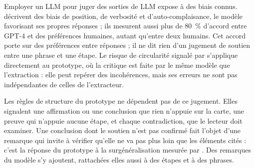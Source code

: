 Employer un LLM pour juger des sorties de LLM expose à des biais connus. \textcite[1]{ref29} décrivent des biais de position, de verbosité et d’auto-complaisance, le modèle favorisant ses propres réponses ; ils mesurent aussi plus de 80~\% d’accord entre GPT-4 et des préférences humaines, autant qu’entre deux humains. Cet accord porte sur des préférences entre réponses ; il ne dit rien d’un jugement de soutien entre une phrase et une étape. Le risque de circularité signalé par \textcite[7]{ref06} s’applique directement au prototype, où la critique est faite par le même modèle que l’extraction : elle peut repérer des incohérences, mais ses erreurs ne sont pas indépendantes de celles de l’extracteur.

Les règles de structure du prototype ne dépendent pas de ce jugement. Elles signalent une affirmation ou une conclusion que rien n’appuie sur la carte, une preuve qui n’appuie aucune étape, et chaque contradiction, que le lecteur doit examiner. Une conclusion dont le soutien n’est pas confirmé fait l’objet d’une remarque qui invite à vérifier qu’elle ne va pas plus loin que les éléments cités : c’est la réponse du prototype à la surgénéralisation mesurée par \textcite{ref30}. Des remarques du modèle s’y ajoutent, rattachées elles aussi à des étapes et à des phrases.
